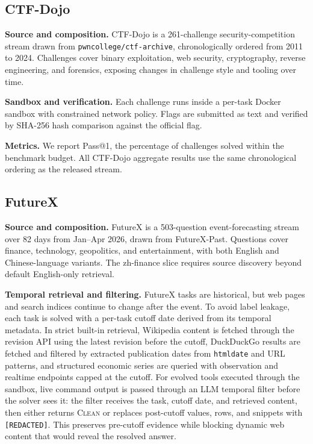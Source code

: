 \documentclass[11pt]{article}
\theoremstyle{plain}
\begin{document}
\subsection{CTF-Dojo}

\noindent\textbf{Source and composition.}
CTF-Dojo is a 261-challenge security-competition stream drawn from \texttt{pwncollege/ctf-archive}, chronologically ordered from 2011 to 2024. Challenges cover binary exploitation, web security, cryptography, reverse engineering, and forensics, exposing changes in challenge style and tooling over time.

\noindent\textbf{Sandbox and verification.}
Each challenge runs inside a per-task Docker sandbox with constrained network policy. Flags are submitted as text and verified by SHA-256 hash comparison against the official flag.

\noindent\textbf{Metrics.}
We report Pass@1, the percentage of challenges solved within the benchmark budget. All CTF-Dojo aggregate results use the same chronological ordering as the released stream.

\subsection{FutureX}

\noindent\textbf{Source and composition.}
FutureX is a 503-question event-forecasting stream over 82 days from Jan--Apr 2026, drawn from FutureX-Past. Questions cover finance, technology, geopolitics, and entertainment, with both English and Chinese-language variants. The zh-finance slice requires source discovery beyond default English-only retrieval.

\noindent\textbf{Temporal retrieval and filtering.}
FutureX tasks are historical, but web pages and search indices continue to change after the event. To avoid label leakage, each task is solved with a per-task cutoff date derived from its temporal metadata. In strict built-in retrieval, Wikipedia content is fetched through the revision API using the latest revision before the cutoff, DuckDuckGo results are fetched and filtered by extracted publication dates from \texttt{htmldate} and URL patterns, and structured economic series are queried with observation and realtime endpoints capped at the cutoff. For evolved tools executed through the sandbox, live command output is passed through an LLM temporal filter before the solver sees it: the filter receives the task, cutoff date, and retrieved content, then either returns \textsc{Clean} or replaces post-cutoff values, rows, and snippets with \texttt{[REDACTED]}. This preserves pre-cutoff evidence while blocking dynamic web content that would reveal the resolved answer.
\end{document}
